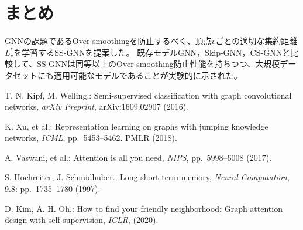 \documentclass[a4j,twocolumn]{jsarticle}
\begin{document}
\section{まとめ}
GNNの課題であるOver-smoothingを防止するべく、頂点$v$ごとの適切な集約距離$L_v^*$を学習するSS-GNNを提案した。
既存モデルGNN，Skip-GNN，CS-GNNと比較して、SS-GNNは同等以上のOver-smoothing防止性能を持ちつつ、大規模データセットにも適用可能なモデルであることが実験的に示された。




\renewcommand{\bibname}{参考文献}
\begin{thebibliography}{1}
\vspace{-2mm}

T. N. Kipf, M. Welling.:
Semi-supervised classification with graph convolutional networks,
{\it arXiv Preprint}, arXiv:1609.02907 (2016).
\vspace{-0.3mm}

K. Xu, et al.:
Representation learning on graphs with jumping knowledge networks,
{\it ICML}, pp.~5453--5462. PMLR (2018).
\vspace{-0.3mm}

A. Vaswani, et al.:
Attention is all you need,
{\it NIPS}, pp.~5998--6008 (2017).
\vspace{-0.3mm}

S. Hochreiter, J. Schmidhuber.:
Long short-term memory,
{\it Neural Computation}, 9.8: pp.~1735--1780 (1997).
\vspace{-0.3mm}

D. Kim, A. H. Oh.:
How to find your friendly neighborhood: Graph attention design with self-supervision,
{\it ICLR}, (2020).
\vspace{-0.3mm}

\end{thebibliography}
\end{document}
